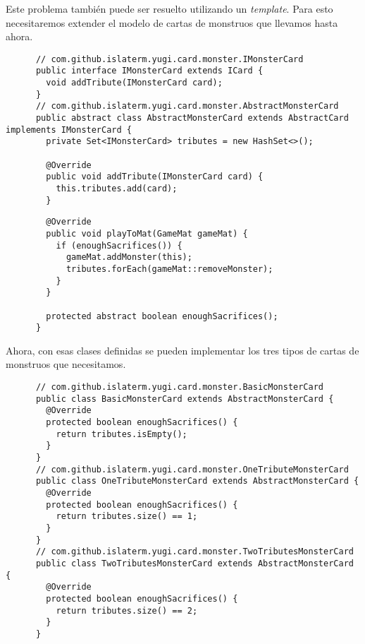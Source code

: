  \begin{Answer}[ref={ex:template-2}]
    Este problema también puede ser resuelto utilizando un \textit{template}.
    Para esto necesitaremos extender el modelo de cartas de monstruos que llevamos hasta 
    ahora.
    \begin{verbatim}
      // com.github.islaterm.yugi.card.monster.IMonsterCard
      public interface IMonsterCard extends ICard {
        void addTribute(IMonsterCard card);
      }
      // com.github.islaterm.yugi.card.monster.AbstractMonsterCard
      public abstract class AbstractMonsterCard extends AbstractCard implements IMonsterCard {
        private Set<IMonsterCard> tributes = new HashSet<>();

        @Override
        public void addTribute(IMonsterCard card) {
          this.tributes.add(card);
        }

    \end{verbatim}

    \begin{verbatim}
        @Override
        public void playToMat(GameMat gameMat) {
          if (enoughSacrifices()) {
            gameMat.addMonster(this);
            tributes.forEach(gameMat::removeMonster);
          }
        }

        protected abstract boolean enoughSacrifices();
      }
    \end{verbatim}

    Ahora, con esas clases definidas se pueden implementar los tres tipos de cartas de 
    monstruos que necesitamos.
    \begin{verbatim}
      // com.github.islaterm.yugi.card.monster.BasicMonsterCard
      public class BasicMonsterCard extends AbstractMonsterCard {
        @Override
        protected boolean enoughSacrifices() {
          return tributes.isEmpty();
        }
      }
      // com.github.islaterm.yugi.card.monster.OneTributeMonsterCard
      public class OneTributeMonsterCard extends AbstractMonsterCard {
        @Override
        protected boolean enoughSacrifices() {
          return tributes.size() == 1;
        }
      }
      // com.github.islaterm.yugi.card.monster.TwoTributesMonsterCard
      public class TwoTributesMonsterCard extends AbstractMonsterCard {
        @Override
        protected boolean enoughSacrifices() {
          return tributes.size() == 2;
        }
      }
    \end{verbatim}
  \end{Answer}
